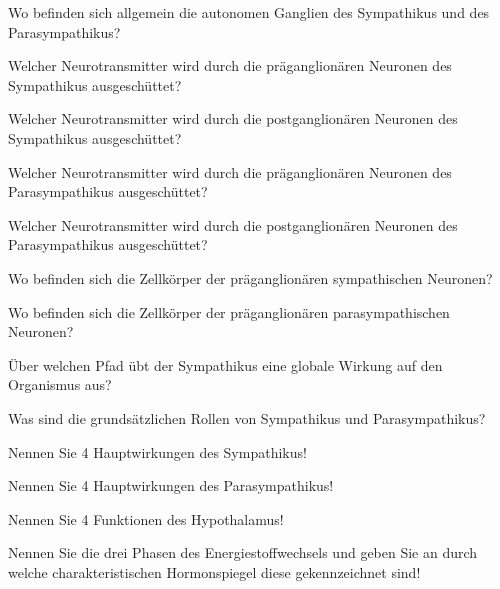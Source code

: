 \documentclass[10pt, a4paper]{exam}
\begin{document}
\begin{questions}
  \begin{solution}
  \end{solution}
  \question Wo befinden sich allgemein die autonomen Ganglien des Sympathikus und des Parasympathikus?
  \begin{solution}
  \end{solution}
  \question Welcher Neurotransmitter wird durch die präganglionären Neuronen des Sympathikus ausgeschüttet?
  \begin{solution}
  \end{solution}
  \question Welcher Neurotransmitter wird durch die postganglionären Neuronen des Sympathikus ausgeschüttet?
  \begin{solution}
  \end{solution}
  \question Welcher Neurotransmitter wird durch die präganglionären Neuronen des Parasympathikus ausgeschüttet?
  \begin{solution}
  \end{solution}
  \question Welcher Neurotransmitter wird durch die postganglionären Neuronen des Parasympathikus ausgeschüttet?
  \begin{solution}
  \end{solution}
  \question Wo befinden sich die Zellkörper der präganglionären sympathischen Neuronen?
  \begin{solution}
  \end{solution}
  \question Wo befinden sich die Zellkörper der präganglionären parasympathischen Neuronen?
  \begin{solution}
  \end{solution}
  \question Über welchen Pfad übt der Sympathikus eine globale Wirkung auf den Organismus aus?
  \begin{solution}
  \end{solution}
  \question Was sind die grundsätzlichen Rollen von Sympathikus und Parasympathikus?
  \begin{solution}
  \end{solution}
  \question Nennen Sie 4 Hauptwirkungen des Sympathikus!
  \begin{solution}
  \end{solution}
  \question Nennen Sie 4 Hauptwirkungen des Parasympathikus!
  \begin{solution}
  \end{solution}
  \question Nennen Sie 4 Funktionen des Hypothalamus!
  \begin{solution}
  \end{solution}
  \question Nennen Sie die drei Phasen des Energiestoffwechsels und geben Sie an durch welche charakteristischen Hormonspiegel diese gekennzeichnet sind!

\end{questions}
\end{document}
